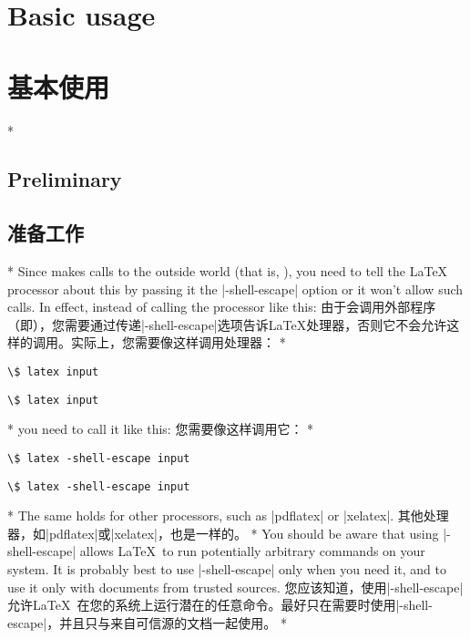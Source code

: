 \begin{paracol}{2}
\section{Basic usage}
\switchcolumn
\section{基本使用}
\switchcolumn[0]*%
\subsection{Preliminary}
\label{sec:basic:preliminary}
\switchcolumn
\subsection{准备工作}
\switchcolumn[0]*%
Since  makes calls to the outside world (that is, ), you need to tell the
\LaTeX{} processor about this by passing it the |-shell-escape| option or it won't allow such calls.
In effect, instead of calling the processor like this:
\switchcolumn
由于会调用外部程序（即），您需要通过传递|-shell-escape|选项告诉\LaTeX{}处理器，否则它不会允许这样的调用。实际上，您需要像这样调用处理器：
\switchcolumn[0]*%
\begin{Verbatim}[commandchars=\\\{\}]
\$ latex input
\end{Verbatim}
\switchcolumn
\begin{Verbatim}[commandchars=\\\{\}]
\$ latex input
\end{Verbatim}
\switchcolumn[0]*%
you need to call it like this:
\switchcolumn
您需要像这样调用它：
\switchcolumn[0]*%
\begin{Verbatim}[commandchars=\\\{\}]
\$ latex -shell-escape input
\end{Verbatim}
\switchcolumn
\begin{Verbatim}[commandchars=\\\{\}]
\$ latex -shell-escape input
\end{Verbatim}
\switchcolumn[0]*%
The same holds for other processors, such as |pdflatex| or |xelatex|.
\switchcolumn
其他处理器，如|pdflatex|或|xelatex|，也是一样的。
\switchcolumn[0]*%
You should be aware that using |-shell-escape| allows \LaTeX\ to run potentially arbitrary commands on your system.  It is probably best to use |-shell-escape| only when you need it, and to use it only with documents from trusted sources.
\switchcolumn
您应该知道，使用|-shell-escape|允许\LaTeX\ 在您的系统上运行潜在的任意命令。最好只在需要时使用|-shell-escape|，并且只与来自可信源的文档一起使用。
\switchcolumn[0]*%

\end{paracol}
